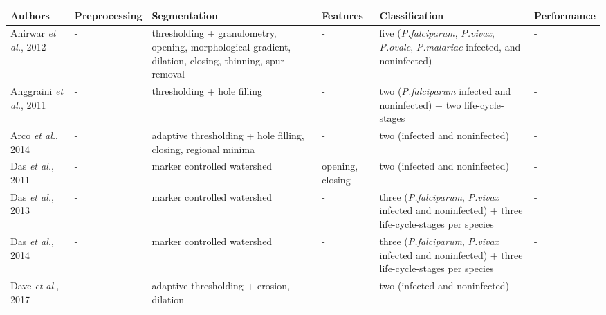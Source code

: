 	\setlength\LTleft{-0.75in}
\footnotesize
    \begin{longtable}{C{2.1cm} C{2.1cm} C{2.3cm} C{1.5cm} C{2.7cm} C{2.2cm} }

		\hline
    	\textbf{Authors} & \textbf{Preprocessing} & \textbf{Segmentation} & \textbf{Features} & \textbf{Classification} & \textbf{Performance}  \\[1pt] \hline

    Ahirwar \emph{et al.}, 2012  &
    	- &
    	thresholding + granulometry, opening, morphological gradient, dilation, closing, thinning, spur removal &
    	- &
    	five (\emph{P.falciparum}, \emph{P.vivax}, \emph{P.ovale}, \emph{P.malariae} infected, and noninfected) &
    	- \vspace{0.6cm} \\

    Anggraini \emph{et al.}, 2011 &
		- &
		thresholding + hole filling &	
		- &
		two (\emph{P.falciparum} infected and noninfected) + two life-cycle-stages &
		-
        \vspace{0.6cm}
		\\
    Arco \emph{et al.}, 2014 &
		- &
		adaptive thresholding + hole filling, closing, regional minima &	
		- &
		two (infected and noninfected) &
		-
		\vspace{0.6cm}
        \\
        
    Das \emph{et al.}, 2011 &
		- &
		marker controlled watershed &	
		opening, closing  &
		two (infected and noninfected) &
		-
		\vspace{0.6cm}
        \\
        
    Das \emph{et al.}, 2013 &
		- &
		marker controlled watershed &	
		- &
		three (\emph{P.falciparum}, \emph{P.vivax} infected and noninfected) + three life-cycle-stages per species &
		-
		\vspace{0.6cm}
        \\    
        
    Das \emph{et al.}, 2014 &
		- &
		marker controlled watershed &	
		- &
		three (\emph{P.falciparum}, \emph{P.vivax} infected and noninfected) + three life-cycle-stages per species &
		-
		\vspace{0.6cm}
        \\
                       
    Dave \emph{et al.}, 2017 &
		- &
		adaptive thresholding + erosion, dilation &	
		- &
		two (infected and noninfected) &
		-
		\vspace{0.6cm}
        \\           
        

\end{longtable}
